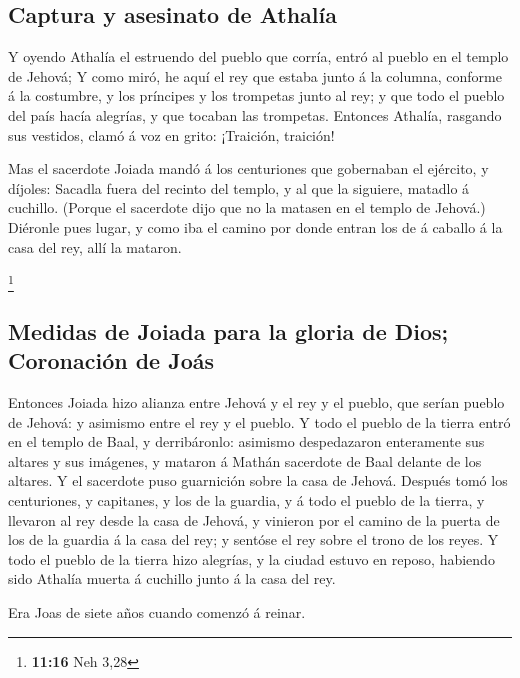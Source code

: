 \hypertarget{captura-y-asesinato-de-athaluxeda}{%
\subsection{Captura y asesinato de
Athalía}\label{captura-y-asesinato-de-athaluxeda}}

 Y oyendo Athalía el estruendo del pueblo que corría, entró
al pueblo en el templo de Jehová;  Y como miró, he aquí el
rey que estaba junto á la columna, conforme á la costumbre, y los
príncipes y los trompetas junto al rey; y que todo el pueblo del país
hacía alegrías, y que tocaban las trompetas. Entonces Athalía, rasgando
sus vestidos, clamó á voz en grito: ¡Traición, traición!

 Mas el sacerdote Joiada mandó á los centuriones que
gobernaban el ejército, y díjoles: Sacadla fuera del recinto del templo,
y al que la siguiere, matadlo á cuchillo. (Porque el sacerdote dijo que
no la matasen en el templo de Jehová.)  Diéronle pues
lugar, y como iba el camino por donde entran los de á caballo á la casa
del rey, allí la mataron.

\footnote{\textbf{11:16} Neh 3,28}

\hypertarget{medidas-de-joiada-para-la-gloria-de-dios-coronaciuxf3n-de-jouxe1s}{%
\subsection{Medidas de Joiada para la gloria de Dios; Coronación de
Joás}\label{medidas-de-joiada-para-la-gloria-de-dios-coronaciuxf3n-de-jouxe1s}}

 Entonces Joiada hizo alianza entre Jehová y el rey y el
pueblo, que serían pueblo de Jehová: y asimismo entre el rey y el
pueblo.  Y todo el pueblo de la tierra entró en el templo
de Baal, y derribáronlo: asimismo despedazaron enteramente sus altares y
sus imágenes, y mataron á Mathán sacerdote de Baal delante de los
altares. Y el sacerdote puso guarnición sobre la casa de Jehová.
 Después tomó los centuriones, y capitanes, y los de la
guardia, y á todo el pueblo de la tierra, y llevaron al rey desde la
casa de Jehová, y vinieron por el camino de la puerta de los de la
guardia á la casa del rey; y sentóse el rey sobre el trono de los reyes.
 Y todo el pueblo de la tierra hizo alegrías, y la ciudad
estuvo en reposo, habiendo sido Athalía muerta á cuchillo junto á la
casa del rey.

 Era Joas de siete años cuando comenzó á reinar.

